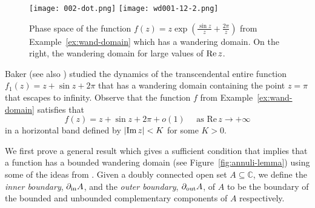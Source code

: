 \documentclass[a4paper, 12pt, reqno]{amsart}
\numberwithin{equation}{section}
\theoremstyle{plain}
\theoremstyle{definition}
\theoremstyle{remark}
\newcommand{\C}{{\mathbb{C}}}
\begin{document}
\begin{figure}[h!]
\texttt{[image: 002-dot.png]}
\texttt{[image: wd001-12-2.png]}
\caption[Phase space of a transcendental self-map of $\C^*$ which has a wandering domain]{Phase space of the function $f(z)=z\exp\left(\frac{\sin z}{z}+\frac{2\pi}{z}\right)$ from Example~\ref{ex:wand-domain} which has a wandering domain. On the right, the wandering domain for large values of $\textup{Re}\, z$.}
\label{fig:wand-domain}
\end{figure}

Baker \cite[Example~5.3]{baker84} (see also \cite[Example~2]{rippon-stallard08}) studied the dynamics of the trans\-cendental entire function $f_1(z)=z+\sin z+2\pi$ that has a wandering domain containing the point $z=\pi$ that escapes to infinity. Observe that the function $f$ from Example~\ref{ex:wand-domain} satisfies that%
\begin{equation}
f(z)=z+\sin z+2\pi+o(1)\quad \mbox{ as } \mbox{Re}\,z\rightarrow +\infty
\label{eq:ex-wand-domain}
\end{equation}
in a horizontal band defined by $|\textup{Im}\, z|<K$ for some $K>0$.

We first prove a general result which gives a sufficient condition that implies that a function has a bounded wandering domain (see Figure~\ref{fig:annuli-lemma}) using some of the ideas from \cite[Lemma~7(c)]{rippon-stallard08}. Given a doubly connected open set $A\subseteq \C$, we define the \textit{inner boundary}, $\partial_\textup{in}A$, and the \textit{outer boundary}, $\partial_\textup{out}A$, of $A$ to be the boundary of the bounded and unbounded complementary components of $A$ respectively.%
\end{document}
